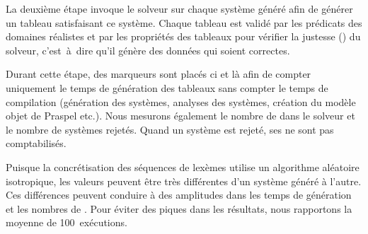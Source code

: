 La deuxième étape invoque le solveur sur chaque système généré afin de générer
un tableau satisfaisant ce système. Chaque tableau est validé par les prédicats
des domaines réalistes et par les propriétés des tableaux pour vérifier la
justesse () du solveur, c'est~à~dire qu'il génère des
données qui soient correctes.

Durant cette étape, des marqueurs sont placés ci et là afin de compter
uniquement le temps de génération des tableaux sans compter le temps de
compilation (génération des systèmes, analyses des systèmes, création du modèle
objet de Praspel etc.). Nous mesurons également le nombre de
 dans le solveur et le nombre de systèmes rejetés. Quand
un système est rejeté, ses  ne sont pas comptabilisés.

Puisque la concrétisation des séquences de lexèmes utilise un algorithme
aléatoire isotropique, les valeurs peuvent être très
différentes d'un système généré à l'autre. Ces différences peuvent conduire à
des amplitudes dans les temps de génération et les nombres de
. Pour éviter des piques dans les résultats, nous
rapportons la moyenne de 100~exécutions.

